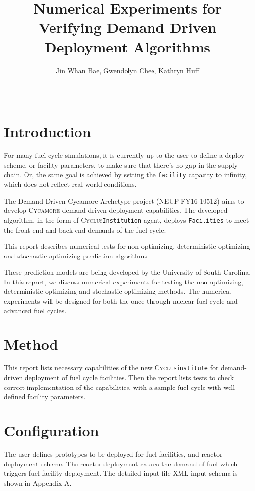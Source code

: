 \documentclass[11pt,letterpaper]{article}
\title{Numerical Experiments for Verifying Demand Driven Deployment Algorithms}
\author{Jin Whan Bae, Gwendolyn Chee, Kathryn Huff}
\newcommand{\Cyclus}{\textsc{Cyclus}\xspace}%
\newcommand{\Cycamore}{\textsc{Cycamore}\xspace}%
\begin{document}
	\maketitle
	\hrule

\section{Introduction}
For many fuel cycle simulations, it is currently up to the user to define
a deploy scheme, or facility parameters, to make sure that there's no gap
in the supply chain. Or, the same goal is achieved by setting the
\texttt{facility} capacity to infinity, which does not reflect real-world
conditions. 

The Demand-Driven Cycamore Archetype project (NEUP-FY16-10512) aims to develop \Cycamore demand-driven deployment capabilities.
The developed algorithm, in the form of \Cyclus \texttt{Institution}
agent, deploys \texttt{Facilities} to meet the front-end and back-end demands of the 
fuel cycle.

This report describes numerical tests for non-optimizing, deterministic-optimizing and stochastic-optimizing prediction algorithms.

These prediction models are being developed by the University of South Carolina. 
In this report, we discuss numerical experiments for testing the non-optimizing, 
deterministic optimizing and stochastic optimizing methods. The numerical 
experiments will be designed for both the once through nuclear fuel 
cycle and advanced fuel cycles. 

\section{Method}
This report lists necessary capabilities of the new \Cyclus \texttt{institute}
for demand-driven deployment of fuel cycle facilities. 
Then the report lists tests to check correct implementation of the capabilities,
with a sample fuel cycle with well-defined facility parameters.


\section{Configuration}
The user defines prototypes to be deployed for fuel facilities,
and reactor deployment scheme.  The reactor deployment causes the demand of fuel
which triggers fuel facility deployment. The detailed input file XML input schema
is shown in Appendix A. 
\end{document}
